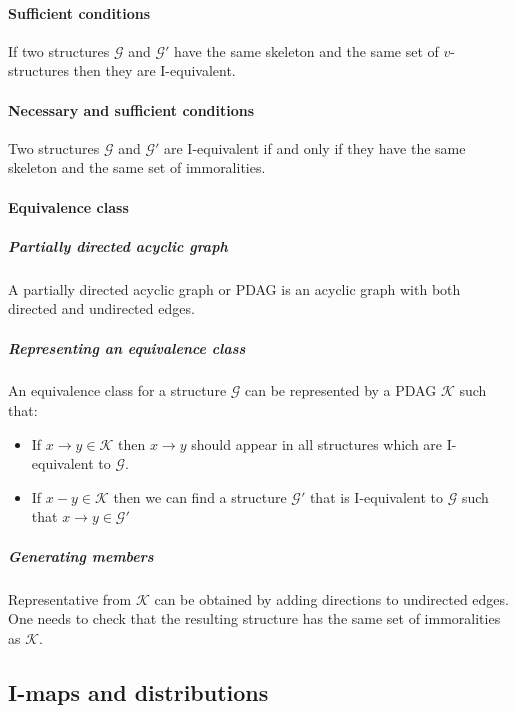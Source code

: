 			\paragraph{Sufficient conditions}
			If two structures $\mathcal{G}$ and $\mathcal{G}'$ have the same skeleton and the same set of $v$-structures then they are I-equivalent.

			\paragraph{Necessary and sufficient conditions}
			Two structures $\mathcal{G}$ and $\mathcal{G}'$ are I-equivalent if and only if they have the same skeleton and the same set of immoralities.

			\paragraph{Equivalence class}

				\subparagraph{Partially directed acyclic graph}
				A partially directed acyclic graph or PDAG is an acyclic graph with both directed and undirected edges.

				\subparagraph{Representing an equivalence class}
				An equivalence class for a structure $\mathcal{G}$ can be represented by a PDAG $\mathcal{K}$ such that:

				\begin{multicols}{2}
					\begin{itemize}
						\item If $x\rightarrow y\in\mathcal{K}$ then $x\rightarrow y$ should appear in all structures which are I-equivalent to $\mathcal{G}$.
						\item If $x - y\in\mathcal{K}$ then we can find a structure $\mathcal{G}'$ that is I-equivalent to $\mathcal{G}$ such that $x\rightarrow y\in \mathcal{G}'$
					\end{itemize}
				\end{multicols}

				\subparagraph{Generating members}
				Representative from $\mathcal{K}$ can be obtained by adding directions to undirected edges.
				One needs to check that the resulting structure has the same set of immoralities as $\mathcal{K}$.

	\subsection{I-maps and distributions}

